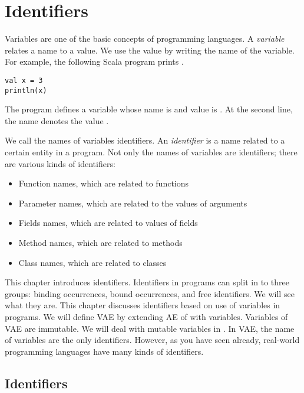 \setchapterpreamble[u]{\margintoc}
\chapter{Identifiers}

\renewcommand{\plang}{\textsf{AE}\xspace}
\renewcommand{\lang}{\textsf{VAE}\xspace}

Variables are one of the basic concepts of programming languages. A
\textit{variable} relates a name to a value. We use the
value by writing the name of the variable. For example, the following Scala program
prints .

\begin{verbatim}
val x = 3
println(x)
\end{verbatim}

The program defines a variable whose name is  and value is . At
the second line, the name  denotes the value .

We call the names of variables identifiers. An
\textit{identifier} is a name related to a
certain entity in a program. Not only the names of variables are identifiers;
there are various kinds of identifiers:

\begin{itemize}
\item Function names, which are related to functions
\item Parameter names, which are related to the values of arguments
\item Fields names, which are related to values of fields
\item Method names, which are related to methods
\item Class names, which are related to classes
\end{itemize}

This chapter introduces identifiers. Identifiers in programs can split in to
three groups: binding occurrences, bound occurrences, and free identifiers.
We will see what they are. This chapter discusses identifiers based on use
of variables in programs. We will define \lang by extending \plang of
 with variables. Variables of \lang are immutable.
We will deal with mutable variables in .
In \lang, the name of variables are
the only identifiers. However, as you have seen already, real-world programming
languages have many kinds of identifiers.

\section{Identifiers}

